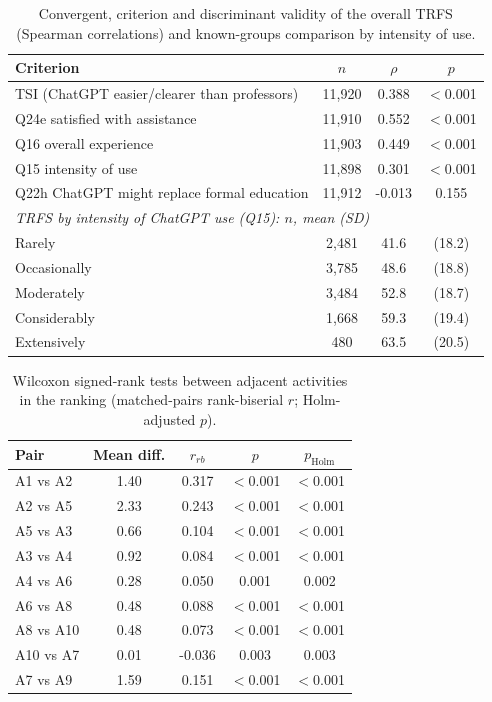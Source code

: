 \begin{table}[!htbp]
\centering
\caption{Convergent, criterion and discriminant validity of the overall TRFS (Spearman correlations) and known-groups comparison by intensity of use.}
\label{tab:A-validity}
\footnotesize
\begin{tabular}{lccc}
\toprule
Criterion & $n$ & $\rho$ & $p$\\
\midrule
TSI (ChatGPT easier/clearer than professors) & 11,920 & 0.388 & $<$0.001\\
Q24e satisfied with assistance & 11,910 & 0.552 & $<$0.001\\
Q16 overall experience & 11,903 & 0.449 & $<$0.001\\
Q15 intensity of use & 11,898 & 0.301 & $<$0.001\\
Q22h ChatGPT might replace formal education & 11,912 & -0.013 & 0.155\\
\midrule
\multicolumn{4}{l}{\textit{TRFS by intensity of ChatGPT use (Q15): $n$, mean (SD)}}\\
\quad Rarely & 2,481 & 41.6 & (18.2)\\
\quad Occasionally & 3,785 & 48.6 & (18.8)\\
\quad Moderately & 3,484 & 52.8 & (18.7)\\
\quad Considerably & 1,668 & 59.3 & (19.4)\\
\quad Extensively & 480 & 63.5 & (20.5)\\
\bottomrule
\end{tabular}
\end{table}

\begin{table}[!htbp]
\centering
\caption{Wilcoxon signed-rank tests between adjacent activities in the ranking (matched-pairs rank-biserial $r$; Holm-adjusted $p$).}
\label{tab:A-pairwise}
\footnotesize
\begin{tabular}{lcccc}
\toprule
Pair & Mean diff. & $r_{rb}$ & $p$ & $p_{\mathrm{Holm}}$\\
\midrule
A1 vs A2 & 1.40 & 0.317 & $<$0.001 & $<$0.001\\
A2 vs A5 & 2.33 & 0.243 & $<$0.001 & $<$0.001\\
A5 vs A3 & 0.66 & 0.104 & $<$0.001 & $<$0.001\\
A3 vs A4 & 0.92 & 0.084 & $<$0.001 & $<$0.001\\
A4 vs A6 & 0.28 & 0.050 & 0.001 & 0.002\\
A6 vs A8 & 0.48 & 0.088 & $<$0.001 & $<$0.001\\
A8 vs A10 & 0.48 & 0.073 & $<$0.001 & $<$0.001\\
A10 vs A7 & 0.01 & -0.036 & 0.003 & 0.003\\
A7 vs A9 & 1.59 & 0.151 & $<$0.001 & $<$0.001\\
\bottomrule
\end{tabular}
\end{table}

